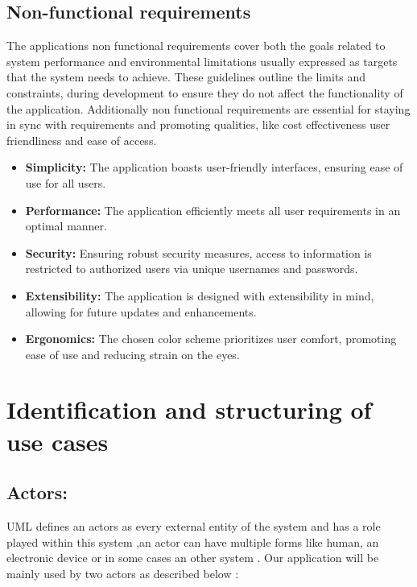 \subsection{Non-functional requirements }
The applications non functional requirements cover both the goals related to system performance and environmental limitations usually expressed as targets that the system needs to achieve. These guidelines outline the limits and constraints, during development to ensure they do not affect the functionality of the application. Additionally non functional requirements are essential for staying in sync with requirements and promoting qualities, like cost effectiveness user friendliness and ease of access. 
\begin{itemize}
\renewcommand\labelitemi{\textbf{\Huge .}}
\item \textbf{Simplicity:} The application boasts user-friendly interfaces, ensuring ease of use for all users.
\item \textbf{Performance:} The application efficiently meets all user requirements in an optimal manner.
\item \textbf{Security:} Ensuring robust security measures, access to information is restricted to authorized users via unique usernames and passwords.

\item \textbf{Extensibility:} The application is designed with extensibility in mind, allowing for future updates and enhancements.
\item \textbf{Ergonomics:} The chosen color scheme prioritizes user comfort, promoting ease of use and reducing strain on the eyes.
\end{itemize}

\section{Identification and structuring of use cases}

\subsection{Actors:}
UML defines an actors as every external entity of the system and has a role played within this system ,an actor can have multiple forms like human, an electronic device or in some cases an other system .
Our application will be mainly used by two actors as described below :


